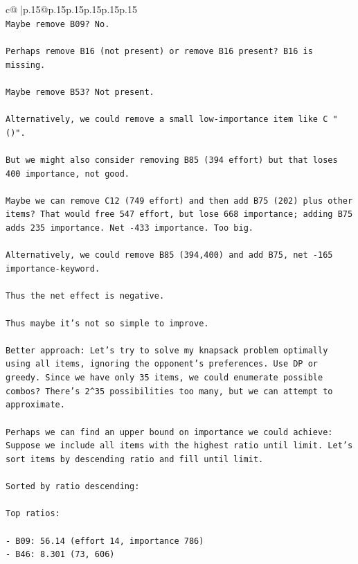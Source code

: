 \documentclass{article}
\begin{document}
{\begin{supertabular}{c@{$\;$}|p{.15\linewidth}@{}p{.15\linewidth}p{.15\linewidth}p{.15\linewidth}p{.15\linewidth}p{.15\linewidth}}
{{{\\ 
\texttt{Maybe remove B09? No.} \\
\\ 
\texttt{Perhaps remove B16 (not present) or remove B16 present? B16 is missing.} \\
\\ 
\texttt{Maybe remove B53? Not present.} \\
\\ 
\texttt{Alternatively, we could remove a small low{-}importance item like C "()".} \\
\\ 
\texttt{But we might also consider removing B85 (394 effort) but that loses 400 importance, not good.} \\
\\ 
\texttt{Maybe we can remove C12 (749 effort) and then add B75 (202) plus other items? That would free 547 effort, but lose 668 importance; adding B75 adds 235 importance. Net {-}433 importance. Too big.} \\
\\ 
\texttt{Alternatively, we could remove B85 (394,400) and add B75, net {-}165 importance{-}keyword.} \\
\\ 
\texttt{Thus the net effect is negative.} \\
\\ 
\texttt{Thus maybe it's not so simple to improve.} \\
\\ 
\texttt{Better approach: Let's try to solve my knapsack problem optimally using all items, ignoring the opponent's preferences. Use DP or greedy. Since we have only 35 items, we could enumerate possible combos? There's 2\^{}35 possibilities too many, but we can attempt to approximate.} \\
\\ 
\texttt{Perhaps we can find an upper bound on importance we could achieve: Suppose we include all items with the highest ratio until limit. Let's sort items by descending ratio and fill until limit.} \\
\\ 
\texttt{Sorted by ratio descending:} \\
\\ 
\texttt{Top ratios:} \\
\\ 
\texttt{{-} B09: 56.14 (effort 14, importance 786)} \\
\texttt{{-} B46: 8.301 (73, 606)} \\
}}}
\end{supertabular}}
\end{document}
